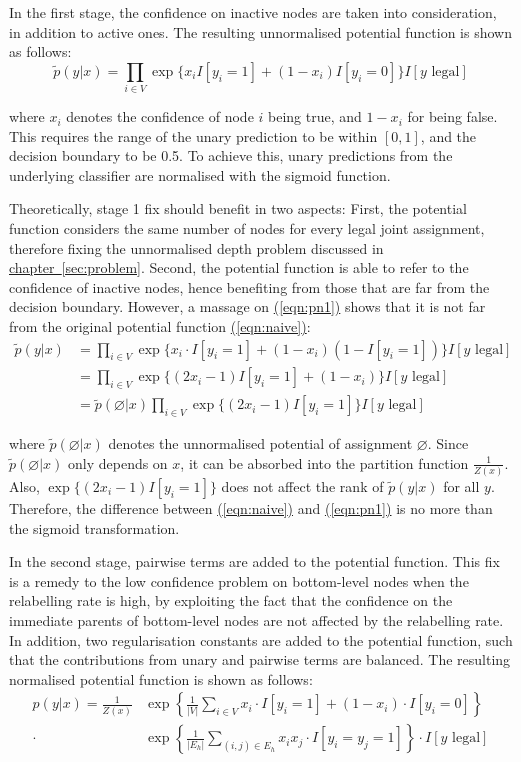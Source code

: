 \documentclass[11pt,a4paper]{book}
\begin{document}
In the first stage, the confidence on inactive nodes are taken into consideration, in addition to active ones. The resulting unnormalised potential function is shown as follows:
\begin{equation}
\tilde{p}(y|x)=\prod_{i\in V}\exp\{x_iI[y_i=1]+(1-x_i)I[y_i=0]\}I[y\text{ legal}]
\label{eqn:pn1}
\end{equation}

where $x_i$ denotes the confidence of node $i$ being true, and $1-x_i$ for being false. This requires the range of the unary prediction to be within $[0,1]$, and the decision boundary to be 0.5. To achieve this, unary predictions from the underlying classifier are normalised with the sigmoid function.

Theoretically, stage 1 fix should benefit in two aspects: First, the potential function considers the same number of nodes for every legal joint assignment, therefore fixing the unnormalised depth problem discussed in \hyperref[sec:problem]{chapter~\ref{sec:problem}}. Second, the potential function is able to refer to the confidence of inactive nodes, hence benefiting from those that are far from the decision boundary. However, a massage on \hyperref[eqn:pn1]{(\ref{eqn:pn1})} shows that it is not far from the original potential function \hyperref[eqn:naive]{(\ref{eqn:naive})}:
\begin{align}
\tilde{p}(y|x)&=\prod_{i\in V}\exp\{x_i\cdot I[y_i=1]+(1-x_i)(1-I[y_i=1])\}I[y\text{ legal}]\nonumber\\
&=\prod_{i\in V}\exp\{(2x_i-1)I[y_i=1]+(1-x_i)\}I[y\text{ legal}]\nonumber\\
&=\tilde{p}(\varnothing|x)\prod_{i\in V}\exp\{(2x_i-1)I[y_i=1]\}I[y\text{ legal}]
\label{eqn:pn2}
\end{align}

where $\tilde{p}(\varnothing|x)$ denotes the unnormalised potential of assignment $\varnothing$. Since $\tilde{p}(\varnothing|x)$ only depends on $x$, it can be absorbed into the partition function $\frac{1}{Z(x)}$. Also, $\exp\{(2x_i-1)I[y_i=1]\}$ does not affect the rank of $\tilde{p}(y|x)$ for all $y$. Therefore, the difference between \hyperref[eqn:naive]{(\ref{eqn:naive})} and \hyperref[eqn:pn1]{(\ref{eqn:pn1})} is no more than the sigmoid transformation.

In the second stage, pairwise terms are added to the potential function. This fix is a remedy to the low confidence problem on bottom-level nodes when the relabelling rate is high, by exploiting the fact that the confidence on the immediate parents of bottom-level nodes are not affected by the relabelling rate. In addition, two regularisation constants are added to the potential function, such that the contributions from unary and pairwise terms are balanced. The resulting normalised potential function is shown as follows:
\begin{align}
p(y|x)=\frac{1}{Z(x)}&\exp\left\{\frac{1}{|V|}\sum_{i\in V}x_i\cdot I[y_i=1]+(1-x_i)\cdot I[y_i=0]\right\}\nonumber\\
\cdot&\exp\left\{\frac{1}{|E_h|}\sum_{(i,j)\in E_h}x_ix_j\cdot I[y_i=y_j=1]\right\}\cdot I[y\text{ legal}]
\end{align}
\end{document}
